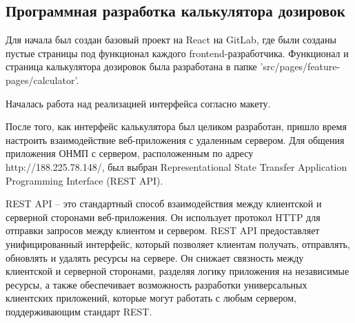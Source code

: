 \subsection{Программная разработка калькулятора дозировок}

Для начала был создан базовый проект на React на GitLab, где были созданы пустые страницы под функционал каждого frontend-разработчика. Функционал и страница калькулятора дозировок была разработана в папке 'src/pages/feature-pages/calculator'.

Началась работа над реализацией интерфейса согласно макету. %

После того, как интерфейс калькулятора был целиком разработан, пришло время настроить взаимодействие веб-приложения с удаленным сервером. Для общения приложения ОНМП с сервером, расположенным по адресу http://188.225.78.148/, был выбран Representational State Transfer Application Programming Interface (REST API). 

REST API -- это стандартный способ взаимодействия между клиентской и серверной сторонами веб-приложения. Он использует протокол HTTP для отправки запросов между клиентом и сервером. REST API предоставляет унифицированный интерфейс, который позволяет клиентам получать, отправлять, обновлять и удалять ресурсы на сервере. Он снижает связность между клиентской и серверной сторонами, разделяя логику приложения на независимые ресурсы, а также обеспечивает возможность разработки универсальных клиентских приложений, которые могут работать с любым сервером, поддерживающим стандарт REST.

